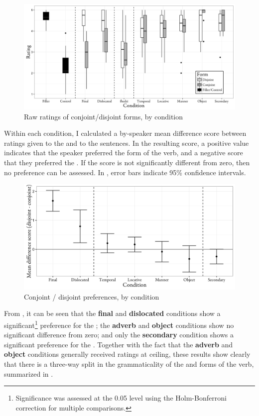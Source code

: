 \documentclass[output=paper,modfonts,nonflat,draftmode]{langsci/langscibook}
\begin{document}
\begin{figure}[p]
	\caption{Raw ratings of conjoint\slash disjoint forms, by condition}
	\label{fig:kusmer:rawscores}
\includegraphics[width=\textwidth]{figures/proc-raw.png}
\end{figure}

Within each condition, I calculated a by-speaker mean difference score between
ratings given to the  and to the  sentences. In the resulting
score, a positive value indicates that the speaker preferred the  form
of the verb, and a negative score that they preferred the . If the score
is not significantly different from zero, then no preference can be assessed.
In , error bars indicate 95\% confidence intervals.


\begin{figure}[p]
	\caption{Conjoint / disjoint preferences, by condition}
	\label{fig:kusmer:meanscores}
\includegraphics[width=\textwidth]{figures/proc-results.png}
\end{figure}


From , it can be seen that the \textbf{final} and
\textbf{dislocated} conditions show a significant\footnote{Significance was
assessed at the 0.05 level using the Holm-Bonferroni correction for multiple
comparisons.} preference for the ; the \textbf{adverb} and
\textbf{object} conditions show no significant difference from zero; and only
the \textbf{secondary} condition shows a significant preference for the
. Together with the fact that the \textbf{adverb} and \textbf{object}
conditions generally received ratings at ceiling, these results show clearly
that there is a three-way split in the grammaticality of the  and
 forms of the verb, summarized in .
\end{document}

